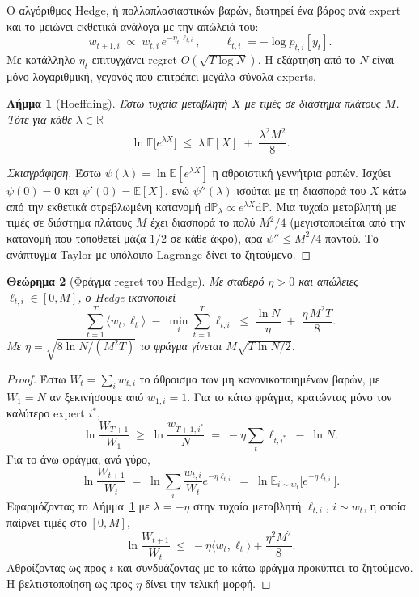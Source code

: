 \documentclass[12pt,a4paper,oneside]{report}
\renewcommand{\_}{\oldunderscore\allowbreak}
\theoremstyle{definition}
\theoremstyle{plain}
\newtheorem{theorem}{Θεώρημα}[chapter]
\newtheorem{lemma}[theorem]{Λήμμα}
\theoremstyle{remark}
\begin{document}
Ο αλγόριθμος Hedge, ή πολλαπλασιαστικών βαρών, διατηρεί ένα βάρος ανά expert και το μειώνει
εκθετικά ανάλογα με την απώλειά του:
\[
w_{t+1,i} \;\propto\; w_{t,i}\, e^{-\eta_t\, \ell_{t,i}},
\qquad \ell_{t,i} = -\log p_{t,i}[y_t].
\]
Με κατάλληλο $\eta_t$ επιτυγχάνει regret $O(\sqrt{T \log N})$. Η εξάρτηση από το $N$ είναι
μόνο λογαριθμική, γεγονός που επιτρέπει μεγάλα σύνολα experts.

\begin{lemma}[Hoeffding]
\label{lem:hoeffding}
Έστω τυχαία μεταβλητή $X$ με τιμές σε διάστημα πλάτους $M$. Τότε για κάθε $\lambda\in\mathbb{R}$
\[
\ln \mathbb{E}\big[e^{\lambda X}\big] \;\leq\; \lambda\, \mathbb{E}[X] \;+\; \frac{\lambda^2 M^2}{8}.
\]
\end{lemma}

\begin{proof}[Σκιαγράφηση]
Έστω $\psi(\lambda) = \ln\mathbb{E}[e^{\lambda X}]$ η αθροιστική γεννήτρια ροπών. Ισχύει
$\psi(0)=0$ και $\psi'(0)=\mathbb{E}[X]$, ενώ $\psi''(\lambda)$ ισούται με τη διασπορά του $X$
κάτω από την εκθετικά στρεβλωμένη κατανομή $\mathrm{d}\mathbb{P}_\lambda \propto e^{\lambda X}
\mathrm{d}\mathbb{P}$. Μια τυχαία μεταβλητή με τιμές σε διάστημα πλάτους $M$ έχει διασπορά το
πολύ $M^2/4$ (μεγιστοποιείται από την κατανομή που τοποθετεί μάζα $1/2$ σε κάθε άκρο), άρα
$\psi''\leq M^2/4$ παντού. Το ανάπτυγμα Taylor με υπόλοιπο Lagrange δίνει το ζητούμενο.
\end{proof}

\begin{theorem}[Φράγμα regret του Hedge]
\label{thm:hedge}
Με σταθερό $\eta>0$ και απώλειες $\ell_{t,i}\in[0,M]$, ο Hedge ικανοποιεί
\[
\sum_{t=1}^{T}\langle w_t, \ell_t\rangle \;-\; \min_i \sum_{t=1}^{T}\ell_{t,i}
\;\leq\; \frac{\ln N}{\eta} \;+\; \frac{\eta\, M^2 T}{8}.
\]
Με $\eta = \sqrt{8\ln N/(M^2T)}$ το φράγμα γίνεται $M\sqrt{T \ln N / 2}$.
\end{theorem}

\begin{proof}
Έστω $W_t = \sum_i w_{t,i}$ το άθροισμα των μη κανονικοποιημένων βαρών, με $W_1 = N$ αν
ξεκινήσουμε από $w_{1,i}=1$. Για το κάτω φράγμα, κρατώντας μόνο τον καλύτερο expert $i^*$,
\[
\ln \frac{W_{T+1}}{W_1} \;\geq\; \ln \frac{w_{T+1,i^*}}{N}
\;=\; -\eta \sum_{t} \ell_{t,i^*} \;-\; \ln N .
\]
Για το άνω φράγμα, ανά γύρο,
\[
\ln \frac{W_{t+1}}{W_t} \;=\; \ln \sum_i \frac{w_{t,i}}{W_t} e^{-\eta \ell_{t,i}}
\;=\; \ln \mathbb{E}_{i\sim w_t}\big[e^{-\eta \ell_{t,i}}\big].
\]
Εφαρμόζοντας το Λήμμα~\ref{lem:hoeffding} με $\lambda=-\eta$ στην τυχαία μεταβλητή
$\ell_{t,i}$, $i\sim w_t$, η οποία παίρνει τιμές στο $[0,M]$,
\[
\ln \frac{W_{t+1}}{W_t} \;\leq\; -\eta \langle w_t, \ell_t\rangle + \frac{\eta^2 M^2}{8}.
\]
Αθροίζοντας ως προς $t$ και συνδυάζοντας με το κάτω φράγμα προκύπτει το ζητούμενο. Η
βελτιστοποίηση ως προς $\eta$ δίνει την τελική μορφή.
\end{proof}
\end{document}
